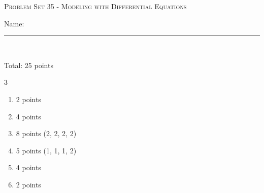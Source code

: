 \documentclass{article}
\begin{document}
\begin{center}
  \large\textsc{Problem Set 35 - Modeling with Differential Equations}
  
      \pspace{12pt}
  \begin{problemonly}\large Name: \rule{5cm}{0.15mm}\\ \end{problemonly}
\end{center}
\begin{grading}
  Total: 25 points 
  \begin{multicols}{3}
    \begin{enumerate}[nosep]
    \item 2 points
    \item 4 points
    \item 8 points (2, 2, 2, 2) 
    \item 5 points (1, 1, 1, 2)
    \item 4 points
    \item 2 points
    \end{enumerate}
  \end{multicols}
\end{grading}
\end{document}
